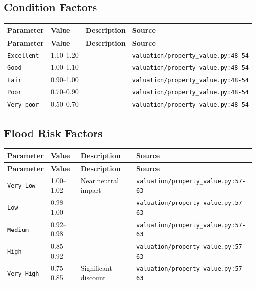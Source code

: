 \documentclass[11pt,a4paper]{article}
\begin{document}
\subsection{Condition Factors}

\begin{longtable}{p{4cm}p{4cm}p{5.5cm}p{3.5cm}}
    \toprule
    \textbf{Parameter} & \textbf{Value} & \textbf{Description} & \textbf{Source} \\
    \midrule
    \endfirsthead
    \toprule
    \textbf{Parameter} & \textbf{Value} & \textbf{Description} & \textbf{Source} \\
    \midrule
    \endhead
    \bottomrule
    \endfoot
    \texttt{Excellent} & 1.10--1.20 &  & {\scriptsize \texttt{valuation/property\_value.py:48-54}} \\
    \texttt{Good} & 1.00--1.10 &  & {\scriptsize \texttt{valuation/property\_value.py:48-54}} \\
    \texttt{Fair} & 0.90--1.00 &  & {\scriptsize \texttt{valuation/property\_value.py:48-54}} \\
    \texttt{Poor} & 0.70--0.90 &  & {\scriptsize \texttt{valuation/property\_value.py:48-54}} \\
    \texttt{Very poor} & 0.50--0.70 &  & {\scriptsize \texttt{valuation/property\_value.py:48-54}} \\
\end{longtable}

\subsection{Flood Risk Factors}

\begin{longtable}{p{4cm}p{4cm}p{5.5cm}p{3.5cm}}
    \toprule
    \textbf{Parameter} & \textbf{Value} & \textbf{Description} & \textbf{Source} \\
    \midrule
    \endfirsthead
    \toprule
    \textbf{Parameter} & \textbf{Value} & \textbf{Description} & \textbf{Source} \\
    \midrule
    \endhead
    \bottomrule
    \endfoot
    \texttt{Very Low} & 1.00--1.02 & Near neutral impact & {\scriptsize \texttt{valuation/property\_value.py:57-63}} \\
    \texttt{Low} & 0.98--1.00 &  & {\scriptsize \texttt{valuation/property\_value.py:57-63}} \\
    \texttt{Medium} & 0.92--0.98 &  & {\scriptsize \texttt{valuation/property\_value.py:57-63}} \\
    \texttt{High} & 0.85--0.92 &  & {\scriptsize \texttt{valuation/property\_value.py:57-63}} \\
    \texttt{Very High} & 0.75--0.85 & Significant discount & {\scriptsize \texttt{valuation/property\_value.py:57-63}} \\
\end{longtable}
\end{document}
